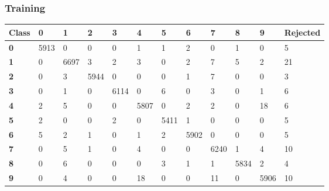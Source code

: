 \documentclass[
  a4paper,            %
  DIV=10,             %
  oneside,            %
  BCOR=5mm,           %
  parskip=half,       %
  numbers=noenddot,   %
  bibtotoc,           %
  listof=totoc,        %
  article
]{scrreprt}
\begin{document}
\subsubsection{Training}
\begin{center}
  \begin{tabular}{|p{1cm}|p{1cm}|p{1cm}|p{1cm}|p{1cm}|p{1cm}|p{1cm}|p{1cm}|p{1cm}|p{1cm}|p{1cm}|p{1.7cm}|}
    \hline
    \textbf{Class} & \textbf{0} & \textbf{1} & \textbf{2} & \textbf{3} & \textbf{4} & \textbf{5} & \textbf{6} & \textbf{7} & \textbf{8} & \textbf{9} & \textbf{Rejected} \\
    \hline
    \textbf{0} & 5913 & 0 & 0 & 0 & 1 & 1 & 2 & 0 & 1 & 0 & 5 \\
    \hline
    \textbf{1} & 0 & 6697 & 3 & 2 & 3 & 0 & 2 & 7 & 5 & 2 & 21 \\
    \hline
    \textbf{2} & 0 & 3 & 5944 & 0 & 0 & 0 & 1 & 7 & 0 & 0 & 3 \\
    \hline
    \textbf{3} & 0 & 1 & 0 & 6114 & 0 & 6 & 0 & 3 & 0 & 1 & 6 \\
    \hline
    \textbf{4} & 2 & 5 & 0 & 0 & 5807 & 0 & 2 & 2 & 0 & 18 & 6 \\
    \hline
    \textbf{5} & 2 & 0 & 0 & 2 & 0 & 5411 & 1 & 0 & 0 & 0 & 5 \\
    \hline
    \textbf{6} & 5 & 2 & 1 & 0 & 1 & 2 & 5902 & 0 & 0 & 0 & 5 \\
    \hline
    \textbf{7} & 0 & 5 & 1 & 0 & 4 & 0 & 0 & 6240 & 1 & 4 & 10 \\
    \hline
    \textbf{8} & 0 & 6 & 0 & 0 & 0 & 3 & 1 & 1 & 5834 & 2 & 4 \\
    \hline
    \textbf{9} & 0 & 4 & 0 & 0 & 18 & 0 & 0 & 11 & 0 & 5906 & 10 \\
    \hline
  \end{tabular}
\end{center}
\end{document}
